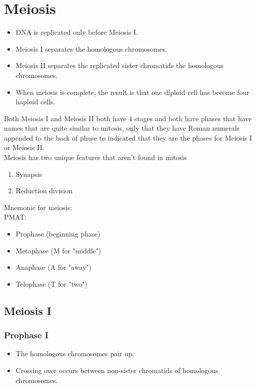 \documentclass[11pt]{article}
\begin{document}
\newpage

\section{Meiosis}
\label{sec:orge9a7de7}
\begin{itemize}
\item DNA is replicated only before Meiosis I.
\item Meiosis I separates the homologous chromosomes.
\item Meiosis II separates the replicated sister chromatids the homologous chromosomes.
\item When meiosis is complete, the result is that one diploid cell has become four haploid cells.
\end{itemize}

Both Meiosis I and Meiosis II both have 4 stages and both have phases that have names that are quite similar to mitosis, only that they have Roman numerals appended to the back of phase to indicated that they are the phases for Meiosis I or Meiosis II.
\\[0pt]

Meiosis has two unique features that aren't found in mitosis
\begin{enumerate}
\item Synapsis
\item Reduction division
\end{enumerate}

Mnemonic for meiosis:
\\[0pt]

PMAT:
\begin{itemize}
\item Prophase (beginning phase)
\item Metaphase (M for "middle")
\item Anaphase (A for "away")
\item Telophase (T for "two")
\end{itemize}

\newpage

\subsection{Meiosis I}
\label{sec:org27fe4ee}

\subsubsection{Prophase I}
\label{sec:orgacd8906}
\begin{itemize}
\item The homologous chromosomes pair up.
\item Crossing over occurs between non-sister chromatids of homologous chromosomes.
\end{itemize}
\end{document}
